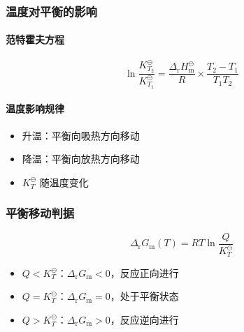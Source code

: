 \subsubsection{温度对平衡的影响}
\paragraph{范特霍夫方程}
\[
\ln \frac{K_{T_2}^\ominus}{K_{T_1}^\ominus} = \frac{\Delta_{\text{r}} H_{\text{m}}^\ominus}{R} \times \frac{T_2 - T_1}{T_1 T_2}
\]

\paragraph{温度影响规律}
\begin{itemize}
\item 升温：平衡向吸热方向移动
\item 降温：平衡向放热方向移动
\item $K_T^\ominus$ 随温度变化
\end{itemize}

\subsubsection{平衡移动判据}
\[
\Delta_{\text{r}} G_{\text{m}}(T) = RT \ln \frac{Q}{K_T^\ominus}
\]
\begin{itemize}
\item $Q < K_T^\ominus$：$\Delta_{\text{r}} G_{\text{m}} < 0$，反应正向进行
\item $Q = K_T^\ominus$：$\Delta_{\text{r}} G_{\text{m}} = 0$，处于平衡状态
\item $Q > K_T^\ominus$：$\Delta_{\text{r}} G_{\text{m}} > 0$，反应逆向进行
\end{itemize}
